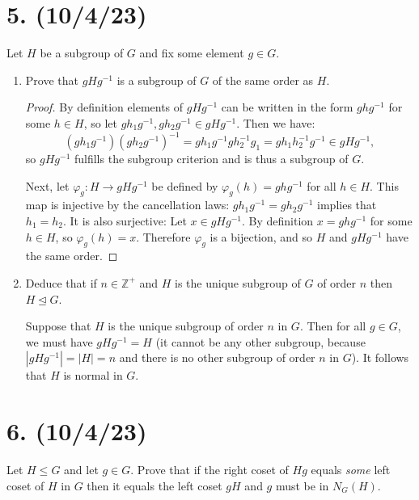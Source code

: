 \documentclass{article}
\begin{document}
\section*{5. (10/4/23)}

Let $H$ be a subgroup of $G$ and fix some element $g \in G$.

\begin{enumerate}[label=(\alph*), itemsep=0em]
    \item Prove that $gHg^{-1}$ is a subgroup of $G$ of the same order as $H$.
          \begin{proof}
            By definition elements of $gHg^{-1}$ can be written in the form $ghg^{-1}$ for some $h \in H$, so let $gh_1g^{-1}, gh_2g^{-1} \in gHg^{-1}$. Then we have:
            \begin{equation*}
                (gh_1g^{-1})(gh_2g^{-1})^{-1} = gh_1g^{-1}gh_2^{-1}g_1 = gh_1h_2^{-1}g^{-1} \in gHg^{-1},
            \end{equation*}
            so $gHg^{-1}$ fulfills the subgroup criterion and is thus a subgroup of $G$.

            Next, let $\varphi_g: H \rightarrow gHg^{-1}$ be defined by $\varphi_g(h) = ghg^{-1}$ for all $h \in H$. This map is injective by the cancellation laws: $gh_1g^{-1} = gh_2g^{-1}$ implies that $h_1 = h_2$. It is also surjective: Let $x \in gHg^{-1}$. By definition $x = ghg^{-1}$ for some $h \in H$, so $\varphi_g(h) = x$. Therefore $\varphi_g$ is a bijection, and so $H$ and $gHg^{-1}$ have the same order.
          \end{proof}
    \item Deduce that if $n \in \mathbb{Z}^+$ and $H$ is the unique subgroup of $G$ of order $n$ then $H \unlhd G$.

          Suppose that $H$ is the unique subgroup of order $n$ in $G$. Then for all $g \in G$, we must have $gHg^{-1} = H$ (it cannot be any other subgroup, because $|gHg^{-1}| = |H| = n$ and there is no other subgroup of order $n$ in $G$). It follows that $H$ is normal in $G$.
\end{enumerate}

\section*{6. (10/4/23)}

Let $H \leq G$ and let $g \in G$. Prove that if the right coset of $Hg$ equals \emph{some} left coset of $H$ in $G$ then it equals the left coset $gH$ and $g$ must be in $N_G(H)$.
\end{document}
